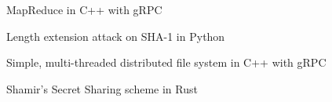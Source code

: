 MapReduce in C++ with gRPC %
 
Length extension attack on SHA-1 in Python%

Simple, multi-threaded distributed file system in C++ with gRPC

Shamir's Secret Sharing scheme in Rust %